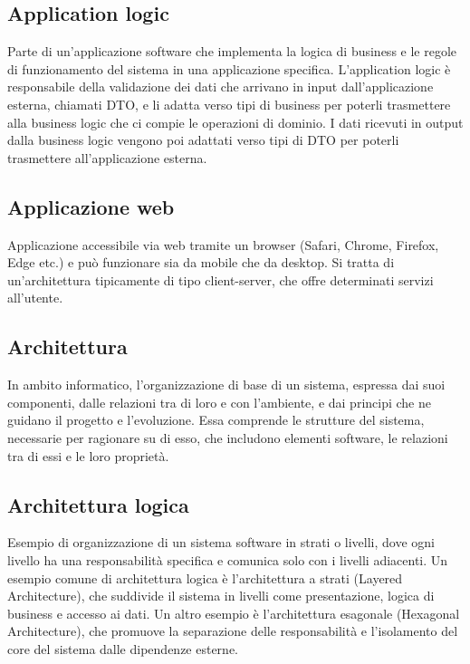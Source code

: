 \hypertarget{sec:application_logic}{}
\subsection*{Application logic}
Parte di un'applicazione software che implementa la logica di business e le regole di funzionamento del sistema in una applicazione specifica.
L'application logic è responsabile della validazione dei dati che arrivano in input dall'applicazione esterna, chiamati DTO, e li adatta
verso tipi di business per poterli trasmettere alla business logic che ci compie le operazioni di dominio. I dati ricevuti in output dalla business logic
vengono poi adattati verso tipi di DTO per poterli trasmettere all'applicazione esterna.

\hypertarget{sec:applicazione_web}{}
\subsection*{Applicazione web}
Applicazione accessibile via web tramite un browser (Safari, Chrome, Firefox, Edge etc.) e può funzionare sia da mobile che da desktop. Si tratta di un'architettura 
tipicamente di tipo client-server, che offre determinati servizi all'utente.

\hypertarget{sec:architettura}{}
\subsection*{Architettura}
In ambito informatico, l'organizzazione di base di un sistema, espressa dai suoi componenti, dalle relazioni tra di loro e con l'ambiente, 
e dai principi che ne guidano il progetto e l'evoluzione. Essa comprende le strutture del sistema, necessarie per ragionare su di esso, 
che includono elementi software, le relazioni tra di essi e le loro proprietà.

\hypertarget{sec:architettura_logica}{}
\subsection*{Architettura logica}
Esempio di organizzazione di un sistema software in strati o livelli, dove ogni livello ha una responsabilità specifica e comunica solo con i livelli adiacenti.
Un esempio comune di architettura logica è l'architettura a strati (Layered Architecture), che suddivide il sistema in livelli come presentazione, logica di business e accesso ai dati.
Un altro esempio è l'architettura esagonale (Hexagonal Architecture), che promuove la separazione delle responsabilità e l'isolamento del core del sistema dalle dipendenze esterne.


